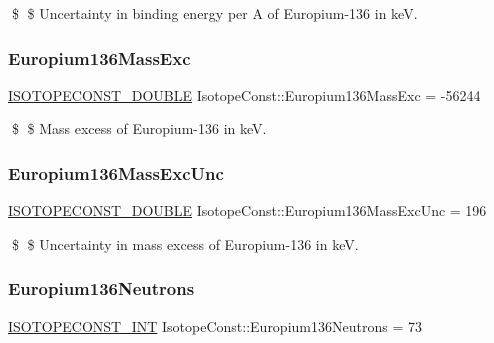 \$ \$ Uncertainty in binding energy per A of Europium-\/136 in keV. \mbox{\label{group___isotope_const-_europium-_eu136_ga308447fc4bf98bbee477475bf5343080}} 
\subsubsection{\texorpdfstring{Europium136\+Mass\+Exc}{Europium136MassExc}}
{\footnotesize\ttfamily \mbox{\hyperlink{group___isotope_const-_macros_ga8f45a7272ce02c0b4c65c44636ed719a}{I\+S\+O\+T\+O\+P\+E\+C\+O\+N\+S\+T\+\_\+\+D\+O\+U\+B\+LE}} Isotope\+Const\+::\+Europium136\+Mass\+Exc = -\/56244}

\$ \$ Mass excess of Europium-\/136 in keV. \mbox{\label{group___isotope_const-_europium-_eu136_ga2930ee65808441d9197358a541caa65c}} 
\subsubsection{\texorpdfstring{Europium136\+Mass\+Exc\+Unc}{Europium136MassExcUnc}}
{\footnotesize\ttfamily \mbox{\hyperlink{group___isotope_const-_macros_ga8f45a7272ce02c0b4c65c44636ed719a}{I\+S\+O\+T\+O\+P\+E\+C\+O\+N\+S\+T\+\_\+\+D\+O\+U\+B\+LE}} Isotope\+Const\+::\+Europium136\+Mass\+Exc\+Unc = 196}

\$ \$ Uncertainty in mass excess of Europium-\/136 in keV. \mbox{\label{group___isotope_const-_europium-_eu136_gad7c5c3682a062c5fb565e12461d1294e}} 
\subsubsection{\texorpdfstring{Europium136\+Neutrons}{Europium136Neutrons}}
{\footnotesize\ttfamily \mbox{\hyperlink{group___isotope_const-_macros_ga5f18360b3e99483a35c32d789e62621c}{I\+S\+O\+T\+O\+P\+E\+C\+O\+N\+S\+T\+\_\+\+I\+NT}} Isotope\+Const\+::\+Europium136\+Neutrons = 73}

